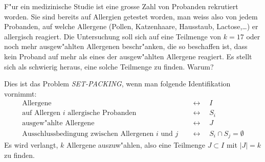 F"ur ein medizinische Studie ist eine grosse Zahl von Probanden rekrutiert
worden.
Sie sind bereits auf Allergien getestet worden, man weiss also von jedem
Probanden, auf welche Allergene (Pollen, Katzenhaare, Hausstaub, Lactose,\dots)
er allergisch reagiert.
Die Untersuchung soll sich auf eine Teilmenge von $k=17$ oder noch
mehr ausgew"ahlten
Allergenen beschr"anken, die so beschaffen ist, dass kein Proband auf mehr als 
eines der ausgew"ahlten Allergene reagiert.
Es stellt sich als schwierig heraus, eine solche Teilmenge zu finden.
Warum?

\begin{loesung}
Dies ist das Problem {\em SET-PACKING}, wenn man folgende Identifikation
vornimmt:
\begin{align*}
\text{Allergene}                            &\quad\leftrightarrow\quad I\\
\text{auf Allergen $i$ allergische Probanden}&\quad\leftrightarrow\quad S_i\\
\text{ausgew"ahlte Allergene}               &\quad\leftrightarrow\quad J\\
\text{Ausschlussbedingung zwischen Allergenen $i$ und $j$}&\quad\leftrightarrow\quad S_i\cap S_j = \emptyset
\end{align*}
Es wird verlangt, $k$ Allergene auszuw"ahlen, also eine Teilmenge
$J\subset I$ mit $|J|=k$ zu finden.
\end{loesung}

